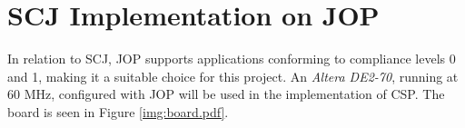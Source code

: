 \section{SCJ Implementation on JOP} %
\label{sec:scj_implementation_on_jop}
In relation to SCJ, JOP supports applications conforming to compliance levels 0 and 1, making it a suitable choice for this project. An \textit{Altera DE2-70}, running at 60 MHz, configured with JOP will be used in the implementation of CSP. The board is seen in Figure \ref{img:board.pdf}.
